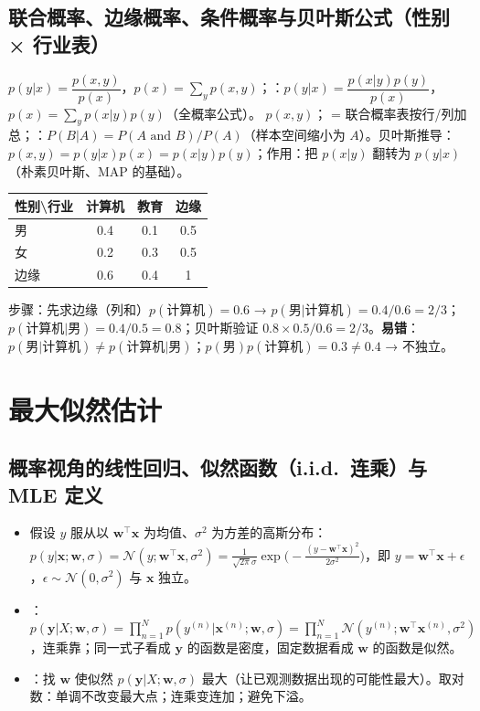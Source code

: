 \subsection{联合概率、边缘概率、条件概率与贝叶斯公式（性别 × 行业表）}
$p(y|x)=\dfrac{p(x,y)}{p(x)}$，$p(x)=\sum_yp(x,y)$；\quad{}：$p(y|x)=\dfrac{p(x|y)p(y)}{p(x)}$，$p(x)=\sum_yp(x|y)p(y)$（全概率公式）。 $p(x,y)$； = 联合概率表按行/列加总；：$P(B|A)=P(A\text{ and }B)/P(A)$（样本空间缩小为 $A$）。贝叶斯推导：$p(x,y)=p(y|x)p(x)=p(x|y)p(y)$；作用：把 $p(x|y)$ 翻转为 $p(y|x)$（朴素贝叶斯、MAP 的基础）。

\noindent\begin{minipage}[c]{0.36\linewidth}\small\centering
\begin{tabular}{@{}lccc@{}}
\toprule
性别\textbackslash 行业 & 计算机 & 教育 & 边缘 \\
\midrule
男 & 0.4 & 0.1 & 0.5 \\
女 & 0.2 & 0.3 & 0.5 \\
边缘 & 0.6 & 0.4 & 1 \\
\bottomrule
\end{tabular}
\end{minipage}\hfill
\begin{minipage}[c]{0.62\linewidth}\small
步骤：先求边缘（列和）$p(\text{计算机})=0.6$ → $p(\text{男}|\text{计算机})=0.4/0.6=2/3$；$p(\text{计算机}|\text{男})=0.4/0.5=0.8$；贝叶斯验证 $0.8\times0.5/0.6=2/3$。\textbf{易错}：$p(\text{男}|\text{计算机})\neq p(\text{计算机}|\text{男})$；$p(\text{男})p(\text{计算机})=0.3\neq0.4$ → 不独立。
\end{minipage}

\section{最大似然估计}

\subsection{概率视角的线性回归、似然函数（i.i.d.\ 连乘）与 MLE 定义}
\begin{itemize}
\item 假设 $y$ 服从以 $\bm w^\top\bm x$ 为均值、$\sigma^2$ 为方差的高斯分布：$p(y|\bm x;\bm w,\sigma)=\mathcal N(y;\bm w^\top\bm x,\sigma^2)=\frac1{\sqrt{2\pi}\sigma}\exp\!\big(-\frac{(y-\bm w^\top\bm x)^2}{2\sigma^2}\big)$，即 $y=\bm w^\top\bm x+\epsilon$，$\epsilon\sim\mathcal N(0,\sigma^2)$ 与 $\bm x$ 独立。
\item {}：$p(\bm y|X;\bm w,\sigma)=\prod_{n=1}^Np(y^{(n)}|\bm x^{(n)};\bm w,\sigma)=\prod_{n=1}^N\mathcal N(y^{(n)};\bm w^\top\bm x^{(n)},\sigma^2)$，连乘靠；同一式子看成 $\bm y$ 的函数是密度，固定数据看成 $\bm w$ 的函数是似然。
\item {}：找 $\bm w$ 使似然 $p(\bm y|X;\bm w,\sigma)$ 最大（让已观测数据出现的可能性最大）。取对数：单调不改变最大点；连乘变连加；避免下溢。
\end{itemize}

